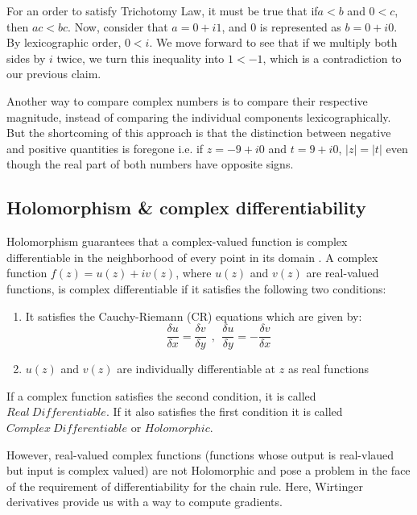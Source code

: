 For an order to satisfy Trichotomy Law, it must be true that if$a<b$ and $0<c$, then $ac<bc$. Now, consider that $a=0+i1$, and $0$ is represented as $b=0+i0$. By lexicographic order, $0<i$. We move forward to see that if we multiply both sides by $i$ twice, we turn this inequality into $1<-1$, which is a contradiction to our previous claim.

Another way to compare complex numbers is to compare their respective magnitude, instead of comparing the individual components lexicographically. But the shortcoming of this approach is that the distinction between negative and positive quantities is foregone i.e. if $z=-9+i0$ and $t=9+i0$, $|z|=|t|$ even though the real part of both numbers have opposite signs.  

\subsection{Holomorphism \& complex differentiability}

Holomorphism guarantees that a complex-valued function is complex differentiable in the neighborhood of every point in its domain \cite{trabelsi2018deep}.
A complex function $f(z)= u(z) + iv(z)$, where $u(z)$ and $v(z)$ are real-valued functions, is complex differentiable if it satisfies the following two conditions:
\begin{enumerate}

	\item It satisfies the Cauchy-Riemann (CR) equations which are given by:
\begin{equation}\label{eq:compdiff}
\frac{\delta u}{\delta x} = \frac{\delta v}{\delta y} ~~,~~ \frac{\delta u}{\delta y} = - \frac{\delta v}{\delta x} 
\end{equation}
	\item $u(z)$ and $v(z)$ are individually differentiable at $z$ as real functions	
\end{enumerate} 


If a complex function satisfies the second condition, it is called  $Real \ Differentiable$. If it also satisfies the first condition it is called $Complex \ Differentiable$ or $Holomorphic$.

However, real-valued complex functions (functions whose output is real-vlaued but input is complex valued) are not Holomorphic and pose a problem in the face of the requirement of differentiability for the chain rule. Here, Wirtinger derivatives provide us with a way to compute gradients.

